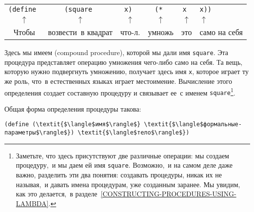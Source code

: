 \begin{center}
\begin{tabular}{cccccl}
\tt{(define} & 
\tt{(square} & 
\tt{x)}      & 
\tt{(*}      &
\tt{x}       &
\tt{x))}       
\\

$\uparrow$   &  
$\uparrow$   & 
$\uparrow$   & 
$\uparrow$   & 
$\uparrow$   &
$\uparrow$   \\

Чтобы        & 
возвести~в квадрат & 
что-л.       &
умножь       & 
это          & 
само на себя  
\end{tabular}
\end{center}
Здесь мы имеем  (compound procedure), которой мы 
дали имя {\tt square}.
Эта процедура представляет
операцию умножения чего-либо само на себя.  Та вещь, которую нужно
подвергнуть умножению, получает здесь имя {\tt x},
которое играет ту же роль, что~в естественных языках играет
местоимение. Вычисление этого определения создает
составную процедуру
и связывает ее~с именем {\tt square}\footnote{Заметьте, что здесь присутствуют две различные
операции: мы создаем процедуру,~и мы даем ей имя
{\tt square}.  Возможно,~и на самом деле даже важно,
разделить эти два понятия: создавать процедуры, никак их не называя,~и 
давать имена процедурам, уже созданным заранее.  Мы увидим, как это
делается,~в разделе~\ref{CONSTRUCTING-PROCEDURES-USING-LAMBDA}.}.

Общая форма определения процедуры такова:

\begin{Verbatim}[fontsize=\small]
(define (\textit{$\langle$имя$\rangle$} \textit{$\langle$формальные-параметры$\rangle$}) \textit{$\langle$тело$\rangle$})
\end{Verbatim}
%

